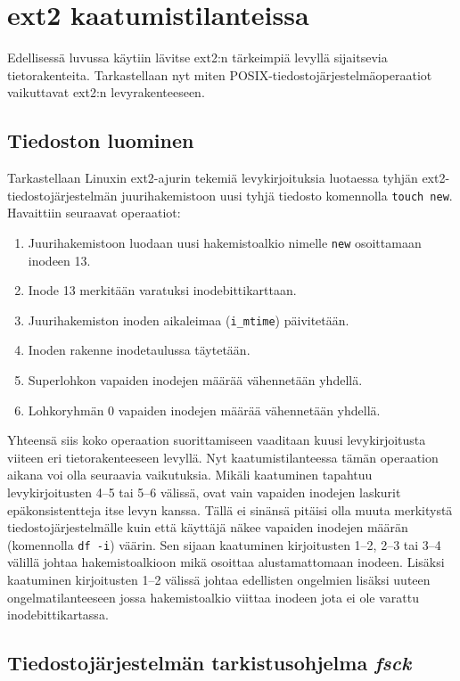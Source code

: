 \section{ext2 kaatumistilanteissa}

Edellisessä luvussa käytiin lävitse ext2:n tärkeimpiä levyllä sijaitsevia tietorakenteita.
Tarkastellaan nyt miten POSIX-tiedostojärjestelmäoperaatiot vaikuttavat ext2:n levyrakenteeseen.

\subsection{Tiedoston luominen}
Tarkastellaan Linuxin ext2-ajurin tekemiä levykirjoituksia luotaessa tyhjän ext2-tiedostojärjestelmän juurihakemistoon uusi tyhjä tiedosto komennolla \texttt{touch new}.
Havaittiin seuraavat operaatiot:

\begin{enumerate}
    \item{Juurihakemistoon luodaan uusi hakemistoalkio nimelle \texttt{new} osoittamaan inodeen 13.}
    \item{Inode 13 merkitään varatuksi inodebittikarttaan.}
    \item{Juurihakemiston inoden aikaleimaa (\texttt{i\_mtime}) päivitetään.}
    \item{Inoden rakenne inodetaulussa täytetään.}
    \item{Superlohkon vapaiden inodejen määrää vähennetään yhdellä.}
    \item{Lohkoryhmän 0 vapaiden inodejen määrää vähennetään yhdellä.}
\end{enumerate}

Yhteensä siis koko operaation suorittamiseen vaaditaan kuusi levykirjoitusta viiteen eri tietorakenteeseen levyllä.
Nyt kaatumistilanteessa tämän operaation aikana voi olla seuraavia vaikutuksia.
Mikäli kaatuminen tapahtuu levykirjoitusten 4--5 tai 5--6 välissä,
ovat vain vapaiden inodejen laskurit epäkonsistentteja itse levyn kanssa.
Tällä ei sinänsä pitäisi olla muuta merkitystä tiedostojärjestelmälle kuin että käyttäjä näkee vapaiden inodejen määrän (komennolla \texttt{df -i}) väärin.
Sen sijaan kaatuminen kirjoitusten 1--2, 2--3 tai 3--4 välillä johtaa hakemistoalkioon mikä osoittaa alustamattomaan inodeen.
Lisäksi kaatuminen kirjoitusten 1--2 välissä johtaa edellisten ongelmien lisäksi uuteen ongelmatilanteeseen jossa hakemistoalkio viittaa inodeen jota ei ole varattu inodebittikartassa.

\subsection{Tiedostojärjestelmän tarkistusohjelma \emph{fsck}}

